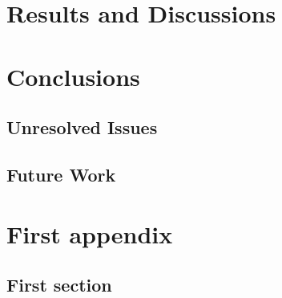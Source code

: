 \documentclass[logo,msc]{infthesis}           %
\begin{document}
\chapter{Results and Discussions}

\chapter{Conclusions}

\section{Unresolved Issues}

\section{Future Work}





\appendix

\chapter{First appendix}

\section{First section}
\end{document}
